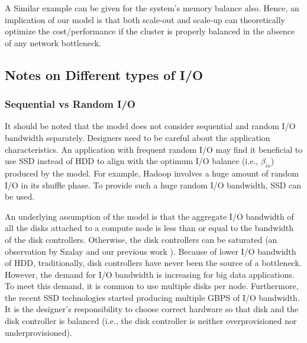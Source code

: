 \documentclass[journal]{IEEEtran}
\begin{document}
A Similar example can be given for the system's memory balance also. Hence, an implication of our model is that both scale-out and scale-up can theoretically optimize the cost/performance if the cluster is properly balanced in the absence of any network bottleneck.
 

\subsection{Notes on Different types of I/O}
\subsubsection{Sequential vs Random I/O}
It should be noted that the model does not consider sequential and random I/O bandwidth separately. Designers need to be careful about the application characteristics. An application with frequent random I/O may find it beneficial to use SSD instead of HDD to align with the optimum I/O balance (i.e., $\beta_{io}$) produced by the model. For example, Hadoop involves a huge amount of random I/O  in its shuffle phase. To provide such a huge random I/O bandwidth, SSD can be used. 

An underlying assumption of the model is that the aggregate I/O bandwidth of all the disks attached to a compute node is less than or equal to the bandwidth of the disk controllers. Otherwise, the disk controllers can be saturated (an observation by Szalay \cite{cluster:AmdahlBalancedBlade} and our previous work \cite{scaleupscaleout:das2015evaluating}). Because of lower I/O bandwidth of HDD, traditionally, disk controllers have never been the source of a bottleneck. However, the demand for I/O bandwidth is increasing for big data applications. To meet this demand, it is common to  use multiple disks per node. Furthermore, the recent SSD technologies started producing multiple GBPS of I/O bandwidth. It is the designer's responsibility to choose correct hardware so that disk and the disk controller is balanced (i.e., the disk controller is neither overprovisioned nor underprovisioned). 
\end{document}
